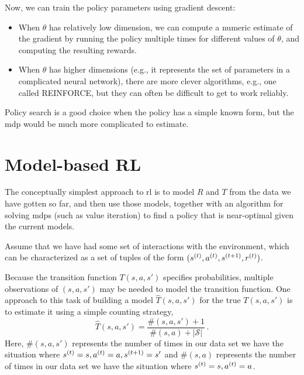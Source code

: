Now, we can train the policy parameters using gradient descent:
\begin{itemize}
  \item When $\theta$ has relatively low dimension, we can compute a
        numeric estimate of the gradient by running the policy multiple
        times for different values of $\theta$, and computing the
        resulting rewards.
  \item When $\theta$ has higher dimensions (e.g., it represents the
        set of parameters in a complicated neural network), there are more
        clever algorithms, e.g., one called {\sc REINFORCE}, but they can
        often be difficult to get to work reliably.
\end{itemize}

Policy search is a good choice when the policy has a simple known
form, but the {\sc mdp} would be much more complicated to estimate.




\section{Model-based RL}
\label{sec-rl_model_based}

The conceptually simplest approach to {\sc rl} is to model $R$ and $T$
from the data we have gotten so far, and then use those models,
together with an algorithm for solving {\sc mdp}s (such as value
iteration) to find a policy that is near-optimal given the current
models.

Assume that we have had some set of interactions with the environment,
which can be characterized as a set of tuples of the form $(s^{(t)},
  a^{(t)}, s^{(t+1)}, r^{(t)})$.

Because the transition function ${T}(s, a, s')$ specifies
probabilities, multiple observations of $(s, a, s')$ may be needed to
model the transition function.  One approach to this task of building
a model $\hat{T}(s, a, s')$ for the true ${T}(s,a,s')$ is to estimate
it using a simple counting strategy,
\begin{equation}
  \hat{T}(s,a,s') = \frac{\#(s,a,s') + 1}{\#(s,a) + \left|
    \mathcal{S}\right|}
  \,.
\end{equation}
Here, $\#(s, a, s')$ represents the number of times in our data set we
have the situation where $s^{(t)} = s, a^{(t)} = a, s^{(t+1)} =
  s'$ and $\#(s, a)$ represents the number of times in our data set we
have the situation where $s^{(t)} = s, a^{(t)} = a$.  


